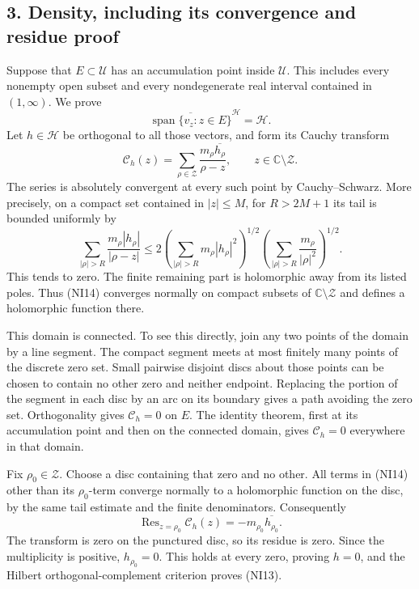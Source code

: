 \documentclass[
  10pt,
  a4paper,
]{article}
\newcounter{none} %
\begin{document}
\subsection{3. Density, including its convergence and residue
proof}\label{density-including-its-convergence-and-residue-proof}

Suppose that \(E\subset\mathcal U\) has an accumulation point inside
\(\mathcal U\). This includes every nonempty open subset and every
nondegenerate real interval contained in \((1,\infty)\). We prove \[
\overline{\operatorname{span}\{v_z:z\in E\}}^{\mathcal H}
=\mathcal H.
\tag{NI13}
\] Let \(h\in\mathcal H\) be orthogonal to all those vectors, and form
its Cauchy transform \[
\mathcal C_h(z)=\sum_{\rho\in\mathcal Z}
\frac{m_\rho\overline{h_\rho}}{\rho-z},
\qquad z\in\mathbb C\setminus\mathcal Z.
\tag{NI14}
\] The series is absolutely convergent at every such point by
Cauchy--Schwarz. More precisely, on a compact set contained in
\(|z|\le M\), for \(R>2M+1\) its tail is bounded uniformly by \[
\sum_{|\rho|>R}
\frac{m_\rho|h_\rho|}{|\rho-z|}
\le
2\left(\sum_{|\rho|>R}m_\rho|h_\rho|^2\right)^{1/2}
\left(\sum_{|\rho|>R}\frac{m_\rho}{|\rho|^2}\right)^{1/2}.
\tag{NI15}
\] This tends to zero. The finite remaining part is holomorphic away
from its listed poles. Thus (NI14) converges normally on compact subsets
of \(\mathbb C\setminus\mathcal Z\) and defines a holomorphic function
there.

This domain is connected. To see this directly, join any two points of
the domain by a line segment. The compact segment meets at most finitely
many points of the discrete zero set. Small pairwise disjoint discs
about those points can be chosen to contain no other zero and neither
endpoint. Replacing the portion of the segment in each disc by an arc on
its boundary gives a path avoiding the zero set. Orthogonality gives
\(\mathcal C_h=0\) on \(E\). The identity theorem, first at its
accumulation point and then on the connected domain, gives
\(\mathcal C_h=0\) everywhere in that domain.

Fix \(\rho_0\in\mathcal Z\). Choose a disc containing that zero and no
other. All terms in (NI14) other than its \(\rho_0\)-term converge
normally to a holomorphic function on the disc, by the same tail
estimate and the finite denominators. Consequently \[
\operatorname{Res}_{z=\rho_0}\mathcal C_h(z)
=-m_{\rho_0}\overline{h_{\rho_0}}.
\tag{NI16}
\] The transform is zero on the punctured disc, so its residue is zero.
Since the multiplicity is positive, \(h_{\rho_0}=0\). This holds at
every zero, proving \(h=0\), and the Hilbert orthogonal-complement
criterion proves (NI13).
\end{document}
